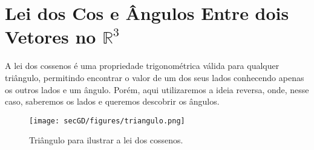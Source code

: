 \section{Lei dos Cos e Ângulos Entre dois Vetores no $\mathbb{R}^3$}
\label{ap:cos}
A lei dos cossenos é uma propriedade trigonométrica válida para qualquer triângulo, permitindo encontrar o valor de um dos seus lados conhecendo apenas os outros lados e um ângulo. Porém, aqui utilizaremos a ideia reversa, onde, nesse caso, saberemos os lados e queremos descobrir os ângulos.
\begin{figure}[H]
	\begin{center}
		\texttt{[image: secGD/figures/triangulo.png]}
	\end{center}
	\caption{Triângulo para ilustrar a lei dos cossenos.}
	\label{fig:coslaw}
\end{figure}
